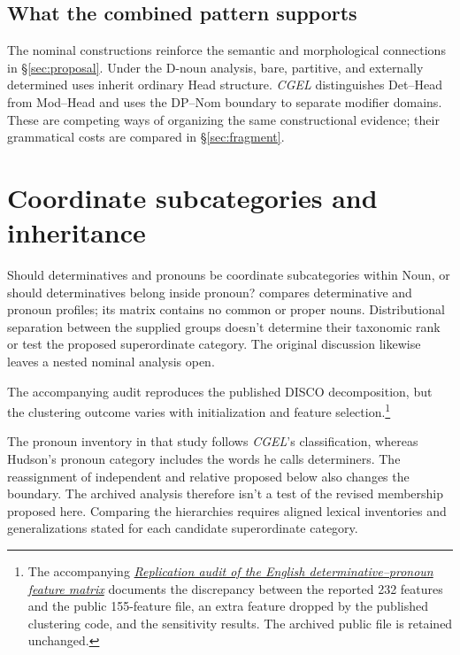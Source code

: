 \documentclass[12pt]{article}
\begin{document}
\subsection{What the combined pattern supports}\label{sec:cumulative}

The nominal constructions reinforce the semantic and morphological connections in §\ref{sec:proposal}. Under the D-noun analysis, bare, partitive, and externally determined uses inherit ordinary Head structure. \textit{CGEL} distinguishes Det--Head from Mod--Head and uses the DP--Nom boundary to separate modifier domains. These are competing ways of organizing the same constructional evidence; their grammatical costs are compared in §\ref{sec:fragment}.

\section{Coordinate subcategories and inheritance}\label{sec:inheritance}

Should determinatives and pronouns be coordinate subcategories within Noun, or should determinatives belong inside pronoun? \textcite{reynolds2021} compares determinative and pronoun profiles; its matrix contains no common or proper nouns. Distributional separation between the supplied groups doesn't determine their taxonomic rank or test the proposed superordinate category. The original discussion likewise leaves a nested nominal analysis open.

The accompanying audit reproduces the published DISCO decomposition, but the clustering outcome varies with initialization and feature selection.\footnote{The accompanying \href{run:matrix-audit.pdf}{\textit{Replication audit of the English determinative--pronoun feature matrix}} documents the discrepancy between the reported 232 features and the public 155-feature file, an extra feature dropped by the published clustering code, and the sensitivity results. The archived public file is retained unchanged.}

The pronoun inventory in that study follows \textit{CGEL}'s classification, whereas Hudson's pronoun category includes the words he calls determiners. The reassignment of independent  and relative  proposed below also changes the boundary. The archived analysis therefore isn't a test of the revised membership proposed here. Comparing the hierarchies requires aligned lexical inventories and generalizations stated for each candidate superordinate category.
\end{document}
